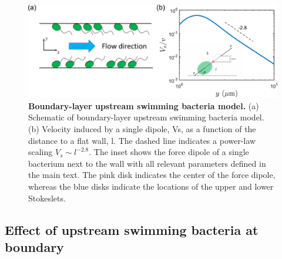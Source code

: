 \begin{figure}[!ht]
	\begin{center}
	\includegraphics[width=5.5 in]{Figs/3-Rheo/7a.pdf}
	\end{center}
	\caption[Boundary-layer upstream swimming bacteria model]
	{
	\textbf{Boundary-layer upstream swimming bacteria model.}
  (a) Schematic of boundary-layer upstream swimming bacteria model.
  (b) Velocity induced by a single dipole, Vs, as a function of the distance to a flat wall, l. The dashed line indicates a power-law scaling $V_s \sim l^{-2.8}$. The inset shows the force dipole of a single bacterium next to the wall with all relevant parameters defined in the main text. The pink disk indicates the center of the force dipole, whereas the blue disks indicate the locations of the upper and lower Stokeslets.
  }
  \label{fig:3-model}
\end{figure}


\subsection{Effect of upstream swimming bacteria at boundary}

